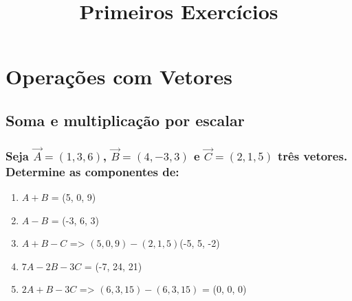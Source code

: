 \documentclass[a4paper,10pt]{article}
\title{Primeiros Exercícios}
\author{}
\begin{document}
\maketitle

\section{Operações com Vetores}

\subsection{Soma e multiplicação por escalar}

\subsubsection{Seja $\vec{A}=(1,3,6)$, $\vec{B}=(4,-3,3)$ e $\vec{C}=(2,1,5)$ três vetores. Determine as componentes de:}

\begin{enumerate}
 \item $A + B$ = 
 (5, 0, 9) 
 
 \item $A - B$ = 
 (-3, 6, 3)
 
 \item $A + B - C$ =>
  $(5, 0, 9) - (2, 1, 5)$(-5, 5, -2)
 
 \item $7A - 2B - 3C$ = 
 (-7, 24, 21)
 
 \item $2A + B - 3C$ => 
 $(6, 3, 15) - (6, 3, 15)$ = (0, 0, 0)

\end{enumerate}
\end{document}
